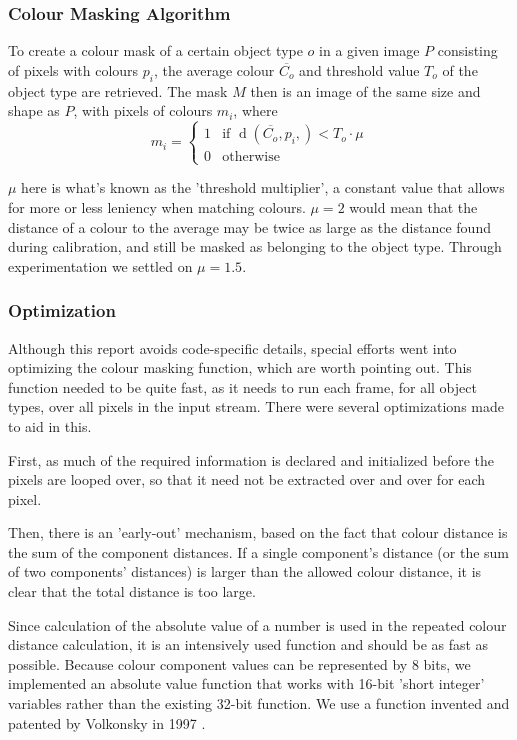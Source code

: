 \documentclass[10pt, abstracton, twocolumn]{scrartcl}
\DeclareMathOperator{\dist}{d}
\begin{document}
\subsubsection{Colour Masking Algorithm}

\begin{samepage}

To create a colour mask of a certain object type $o$ in a given image $P$ consisting of pixels with colours $p_i$, the average colour $\overline{C_o}$ and threshold value $T_o$ of the object type are retrieved. The mask $M$ then is an image of the same size and shape as $P$, with pixels of colours $m_i$, where
\nopagebreak
\[
m_i =
        \begin{cases}
        1 & \mbox{if } \dist( \overline{C_o}, p_i, ) < T_o \cdot \mu \\
        0 & \mbox{otherwise}
        \end{cases}
\]

\end{samepage}

$\mu$ here is what's known as the 'threshold multiplier', a constant value that allows for more or less leniency when matching colours. $\mu = 2$ would mean that the distance of a colour to the average may be twice as large as the distance found during calibration, and still be masked as belonging to the object type. Through experimentation we settled on $\mu = 1.5$.

\subsubsection{Optimization}
Although this report avoids code-specific details, special efforts went into optimizing the colour masking function, which are worth pointing out. This function needed to be quite fast, as it needs to run each frame, for all object types, over all pixels in the input stream. There were several optimizations made to aid in this.

First, as much of the required information is declared and initialized before the pixels are looped over, so that it need not be extracted over and over for each pixel.

Then, there is an 'early-out' mechanism, based on the fact that colour distance is the sum of the component distances. If a single component's distance (or the sum of two components' distances) is larger than the allowed colour distance, it is clear that the total distance is too large.

Since calculation of the absolute value of a number is used in the repeated colour distance calculation, it is an intensively used function and should be as fast as possible. Because colour component values can be represented by 8 bits, we implemented an absolute value function that works with 16-bit 'short integer' variables rather than the existing 32-bit function. We use a function invented and patented by Volkonsky in 1997 \cite{volkonsky2000apparatus}.
\end{document}
